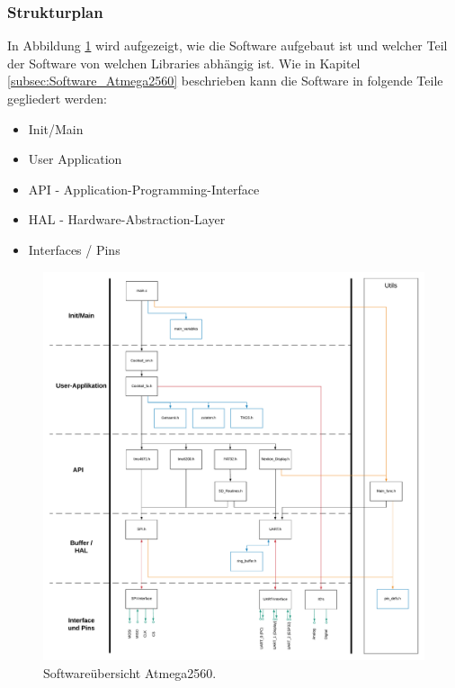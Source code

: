 
\subsubsection{Strukturplan}
\label{subsubsec:Strukturplan_Atmega}

In Abbildung \ref{fig:Softwareuebersicht_Atmega2560} wird aufgezeigt, wie die Software aufgebaut ist und welcher Teil der Software von welchen Libraries abhängig ist. Wie in Kapitel \ref{subsec:Software_Atmega2560} beschrieben kann die Software in folgende Teile gegliedert werden:
\begin{itemize}
\item Init/Main
\item User Application
\item API - Application-Programming-Interface
\item HAL - Hardware-Abstraction-Layer
\item Interfaces / Pins
\end{itemize}

\begin{figure}[h!]
	\centering
	\includegraphics[width=\textwidth]{graphics/Softwareuebersicht.pdf}
	\caption{Softwareübersicht Atmega2560.}
	\label{fig:Softwareuebersicht_Atmega2560}
\end{figure}

